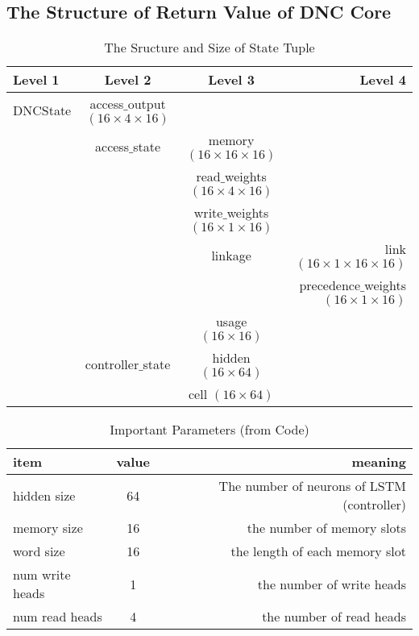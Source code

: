 \documentclass{article}
\begin{document}
\subsection{The Structure of Return Value of DNC Core}
\begin{table}
\centering
\caption{The Sructure and Size of State Tuple}
\begin{tabular}{| l | c | c | r |} \hline
Level 1  & Level 2          & Level 3           & Level 4  \\ \hline
DNCState & access$\_$output $(16\times4\times16)$ &                   &   \\ \hline
         & access$\_$state  & memory $(16\times16\times16)$ &   \\ \hline
         &                  & read$\_$weights $(16\times4\times16)$ &   \\ \hline
         &                  & write$\_$weights $(16\times1\times16)$ &   \\ \hline
         &                  & linkage           & link $(16\times1\times16\times16)$ \\ \hline
         &                  &                   & precedence$\_$weights $(16\times1\times16)$ \\ \hline
         &                  & usage $(16\times16)$ & \\ \hline
         & controller$\_$state    & hidden $(16\times64)$ & \\ \hline
         &                  & cell $(16\times64)$ & \\ \hline
\end{tabular}
\label{tab:TupleStructureSize}
\end{table}

\begin{table}
\centering
\caption{Important Parameters (from Code)}
\begin{tabular}{| l | c | r |} \hline
item        & value & meaning \\ \hline
hidden size & 64 & The number of neurons of LSTM (controller) \\ \hline
memory size & 16 & the number of memory slots \\ \hline
word size & 16 & the length of each memory slot \\ \hline
num write heads & 1 & the number of write heads \\ \hline
num read heads  & 4 & the number of read heads \\ \hline
\end{tabular}
\end{table}
\end{document}
